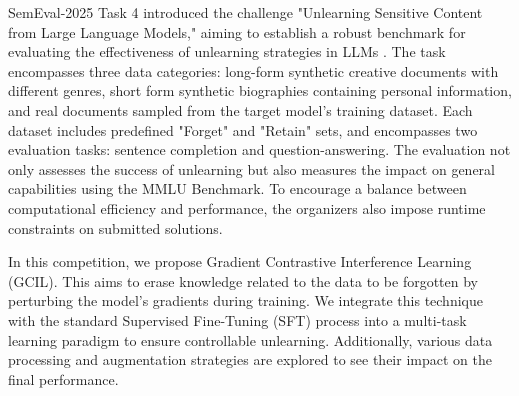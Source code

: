 \documentclass[11pt]{article}
\begin{document}

SemEval-2025 Task 4 introduced the challenge "Unlearning Sensitive Content from Large Language Models," aiming to establish a robust benchmark for evaluating the effectiveness of unlearning strategies in LLMs \cite{ramakrishna2025lumellmunlearningmultitask}. The task encompasses three data categories: long-form synthetic creative documents with different genres, short form synthetic biographies containing personal information, and real documents sampled from the target model’s training dataset. Each dataset includes predefined "Forget" and "Retain" sets, and encompasses two evaluation tasks: sentence completion and question-answering. The evaluation not only assesses the success of unlearning but also measures the impact on general capabilities using the MMLU Benchmark. To encourage a balance between computational efficiency and performance, the organizers also impose runtime constraints on submitted solutions.


In this competition, we propose Gradient Contrastive Interference Learning (GCIL). This aims to erase knowledge related to the data to be forgotten by perturbing the model's gradients during training. We integrate this technique with the standard Supervised Fine-Tuning (SFT) process into a multi-task learning paradigm to ensure controllable unlearning. Additionally, various data processing and augmentation strategies \cite{choi2024snap, shi2024ulmr} are explored to see their impact on the final performance.
\end{document}
